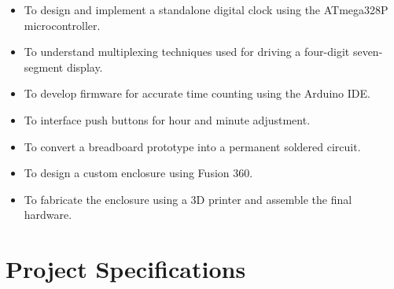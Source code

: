 \documentclass[12pt,a4paper]{article}
\begin{document}
\begin{itemize}

\item To design and implement a standalone digital clock using the ATmega328P microcontroller.

\item To understand multiplexing techniques used for driving a four-digit seven-segment display.

\item To develop firmware for accurate time counting using the Arduino IDE.

\item To interface push buttons for hour and minute adjustment.

\item To convert a breadboard prototype into a permanent soldered circuit.

\item To design a custom enclosure using Fusion 360.

\item To fabricate the enclosure using a 3D printer and assemble the final hardware.

\end{itemize}


\section{Project Specifications}
\end{document}
